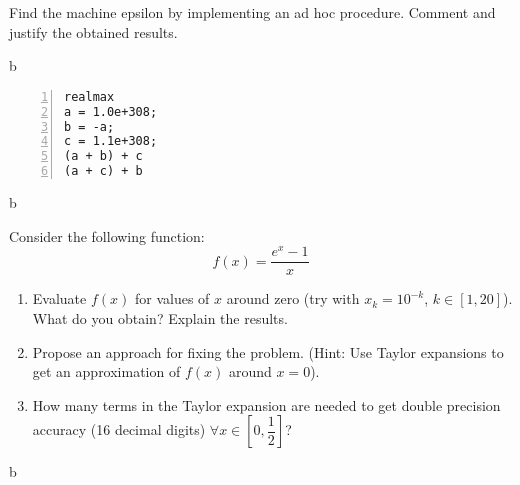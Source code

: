 \documentclass[12pt, a4paper]{report}
\newtheorem[style=M,bodystyle=\normalfont]{theorem}{Theorem}
\newtheorem[style=M,bodystyle=\normalfont]{corollary}{Corollary}
\newtheorem[style=M,bodystyle=\normalfont]{lemma}{Lemma}
\newtheorem[style=M,bodystyle=\normalfont]{definition}{Definition}
\begin{document}
    \begin{Exercise}[label=5]
        Find the machine epsilon by implementing an ad hoc procedure. Comment and justify the obtained results.
    \end{Exercise}
    \begin{Answer}[ref=5]
        b
    \end{Answer}
    
    \newpage

    \begin{Exercise}[label=6]
        \begin{lstlisting}[frame=single, numbers=left, style=Matlab-bw]
realmax
a = 1.0e+308;
b = -a;
c = 1.1e+308;
(a + b) + c
(a + c) + b  
        \end{lstlisting}
    \end{Exercise}
    \begin{Answer}[ref=6]
        b
    \end{Answer}

    \newpage

    \begin{Exercise}[label=7]
        Consider the following function:
        \[f(x)=\dfrac{e^x-1}{x}\]
        \begin{enumerate}
            \item Evaluate $f(x)$ for values of $x$ around zero (try with $x_k = 10^{-k}$, $k \in [1, 20]$). What do you obtain? Explain the results.
            \item Propose an approach for fixing the problem. (Hint: Use Taylor expansions to get an approximation of $f(x)$ around $x = 0$). 
            \item How many terms in the Taylor expansion are needed to get double precision accuracy (16 decimal digits) $\forall x \in \left[0, \dfrac{1}{2}\right]$?
        \end{enumerate}
    \end{Exercise}
    \begin{Answer}[ref=7]
        b
    \end{Answer}

    \newpage
\end{document}
